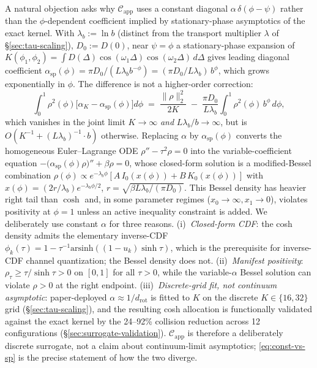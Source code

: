 A natural objection asks why $\mathcal{C}_{\mathrm{app}}$ uses a constant diagonal $\alpha\,\delta(\phi{-}\psi)$ rather than the $\phi$-dependent coefficient implied by stationary-phase asymptotics of the exact kernel. With $\lambda_b{:=}\ln b$ (distinct from the transport multiplier $\lambda$ of \S\ref{sec:tau-scaling}), $D_0{:=}D(0)$, near $\psi{=}\phi$ a stationary-phase expansion of $K(\phi_1,\phi_2){=}\int D(\Delta)\cos(\omega_1\Delta)\cos(\omega_2\Delta)\,d\Delta$ gives leading diagonal coefficient $\alpha_{\mathrm{sp}}(\phi){=}\pi D_0/(L\lambda_b b^{-\phi}){=}(\pi D_0/L\lambda_b)\,b^{\phi}$, which grows exponentially in $\phi$. The difference is not a higher-order correction:
\begin{equation}
\int_0^1 \rho^2(\phi)\bigl[\alpha_K - \alpha_{\mathrm{sp}}(\phi)\bigr]d\phi
\;=\; \frac{\|\rho\|_2^2}{2K} \;-\; \frac{\pi D_0}{L\lambda_b}\!\int_0^1\!\rho^2(\phi)\,b^{\phi}\,d\phi,
\label{eq:const-vs-sp}
\end{equation}
which vanishes in the joint limit $K{\to}\infty$ \emph{and} $L\lambda_b/b{\to}\infty$, but is $O(K^{-1}{+}(L\lambda_b)^{-1}\!\cdot b)$ otherwise. Replacing $\alpha$ by $\alpha_{\mathrm{sp}}(\phi)$ converts the homogeneous Euler--Lagrange ODE $\rho''{-}\tau^2\rho{=}0$ into the variable-coefficient equation $-\bigl(\alpha_{\mathrm{sp}}(\phi)\rho\bigr)''+\beta\rho{=}0$, whose closed-form solution is a modified-Bessel combination $\rho(\phi){\propto}e^{-\lambda_b\phi}[A\,I_0(x(\phi))+B\,K_0(x(\phi))]$ with $x(\phi){=}(2r/\lambda_b)e^{-\lambda_b\phi/2}$, $r{=}\sqrt{\beta L\lambda_b/(\pi D_0)}$. This Bessel density has heavier right tail than $\cosh$ and, in some parameter regimes ($x_0{\to}\infty,x_1{\to}0$), violates positivity at $\phi{=}1$ unless an active inequality constraint is added. We deliberately use constant $\alpha$ for three reasons. (i)~\emph{Closed-form CDF}: the cosh density admits the elementary inverse-CDF $\phi_k(\tau){=}1-\tau^{-1}\mathrm{arsinh}((1{-}u_k)\sinh\tau)$, which is the prerequisite for inverse-CDF channel quantization; the Bessel density does not. (ii)~\emph{Manifest positivity}: $\rho_\tau{\geq}\tau/\sinh\tau{>}0$ on $[0,1]$ for all $\tau{>}0$, while the variable-$\alpha$ Bessel solution can violate $\rho{>}0$ at the right endpoint. (iii)~\emph{Discrete-grid fit, not continuum asymptotic}: paper-deployed $\alpha{\approx}1/d_{\mathrm{rot}}$ is fitted to $K$ on the discrete $K{\in}\{16,32\}$ grid (\S\ref{sec:tau-scaling}), and the resulting cosh allocation is functionally validated against the exact kernel by the 24--92\% collision reduction across 12 configurations (\S\ref{sec:surrogate-validation}). $\mathcal{C}_{\mathrm{app}}$ is therefore a deliberately discrete surrogate, not a claim about continuum-limit asymptotics; \eqref{eq:const-vs-sp} is the precise statement of how the two diverge.

